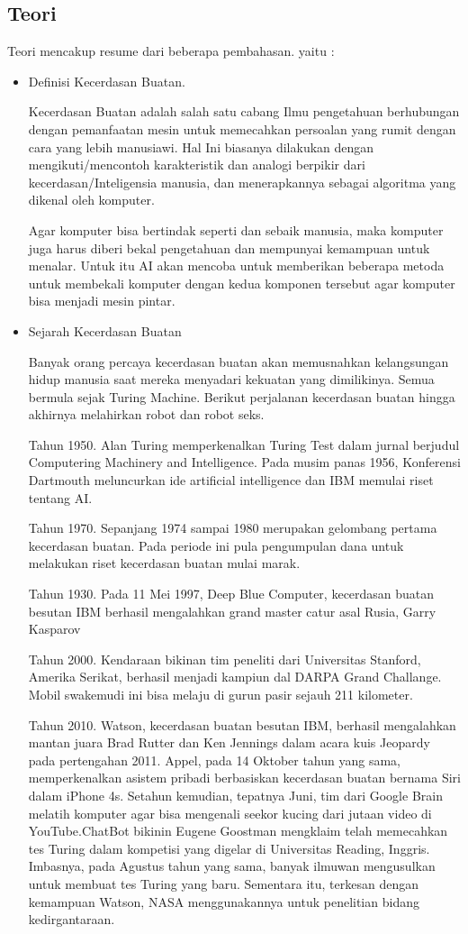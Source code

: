 \begin{itemize}
\subsection{Teori}
Teori mencakup resume dari beberapa pembahasan. yaitu :
\begin{itemize}
\item Definisi Kecerdasan Buatan.
\par Kecerdasan Buatan adalah salah satu cabang Ilmu pengetahuan berhubungan dengan pemanfaatan mesin untuk memecahkan persoalan yang rumit dengan cara yang lebih manusiawi. Hal Ini biasanya dilakukan dengan mengikuti/mencontoh karakteristik dan analogi berpikir dari kecerdasan/Inteligensia manusia, dan menerapkannya sebagai algoritma yang dikenal oleh komputer.
\par Agar komputer bisa bertindak seperti dan sebaik manusia, maka komputer juga harus diberi bekal pengetahuan dan mempunyai kemampuan untuk menalar. Untuk itu AI akan mencoba untuk memberikan beberapa metoda untuk membekali komputer dengan kedua komponen tersebut agar komputer bisa menjadi mesin pintar.
\item Sejarah Kecerdasan Buatan
\par Banyak orang percaya kecerdasan buatan akan memusnahkan kelangsungan hidup manusia saat mereka menyadari kekuatan yang dimilikinya. Semua bermula sejak Turing Machine. Berikut perjalanan kecerdasan buatan hingga akhirnya melahirkan robot dan robot seks.
\par Tahun 1950. Alan Turing memperkenalkan Turing Test dalam jurnal berjudul Computering Machinery and Intelligence. Pada musim panas 1956, Konferensi Dartmouth meluncurkan ide artificial intelligence dan IBM memulai riset tentang AI.
\par Tahun 1970. Sepanjang 1974 sampai 1980 merupakan gelombang pertama kecerdasan buatan. Pada periode ini pula pengumpulan dana untuk melakukan riset kecerdasan buatan mulai marak.
\par Tahun 1930. Pada 11 Mei 1997, Deep Blue Computer, kecerdasan buatan besutan IBM berhasil mengalahkan grand master catur asal Rusia, Garry Kasparov
\par Tahun 2000. Kendaraan bikinan tim peneliti dari Universitas Stanford, Amerika Serikat, berhasil menjadi kampiun dal DARPA Grand Challange. Mobil swakemudi ini bisa melaju di gurun pasir sejauh 211 kilometer.
\par Tahun 2010. Watson, kecerdasan buatan besutan IBM, berhasil mengalahkan mantan juara Brad Rutter dan Ken Jennings dalam acara kuis Jeopardy pada pertengahan 2011. Appel, pada 14 Oktober tahun yang sama, memperkenalkan asistem pribadi berbasiskan kecerdasan buatan bernama Siri dalam iPhone 4s. Setahun kemudian, tepatnya Juni, tim dari Google Brain melatih komputer agar bisa mengenali seekor kucing dari jutaan video di YouTube.ChatBot bikinin Eugene Goostman mengklaim telah memecahkan tes Turing dalam kompetisi yang digelar di Universitas Reading, Inggris. Imbasnya, pada Agustus tahun yang sama, banyak ilmuwan mengusulkan untuk membuat tes Turing yang baru. Sementara itu, terkesan dengan kemampuan Watson, NASA menggunakannya untuk penelitian bidang kedirgantaraan.

\end{itemize}
\end{itemize}
